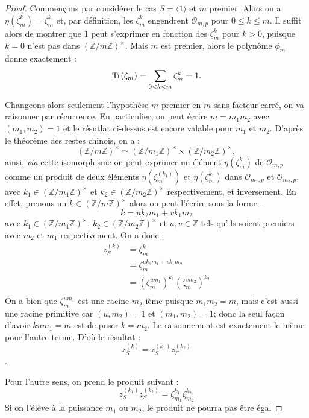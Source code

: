 \documentclass[a4paper]{article} %
\numberwithin{section}{part}
\numberwithin{equation}{section}
\newcommand\nroot[1]{\textit{#1}-ième}
\newcommand\zmodninv[1]{(\mathbb{Z}/#1\mathbb{Z})^{\times}}
\newcommand\EO{\mathcal{O}}
\begin{document}
\begin{proof}

Commençons par considérer le cas $S = \langle1\rangle$ et $m$ premier. Alors on 
a $\eta(\zeta_m^k) = \zeta_m^k$ et, par définition, les $\zeta_m^k$ engendrent 
$\EO_{m,p}$ pour $0 \leq k\leq m$. Il suffit alors de montrer que $1$ peut 
s'exprimer en fonction des $\zeta_m^k$ pour $k > 0$, puisque $k = 0$ n'est pas 
dans $\zmodninv{m}$. Mais $m$ est premier, alors le polynôme $\phi_m$ 
donne exactement :
\begin{equation}
\textup{Tr}(\zeta_m) = \sum_{0 < k < m}{\zeta_m^k} = 1.
\end{equation}

Changeons alors seulement l'hypothèse $m$ premier en $m$ sans facteur carré, on 
va raisonner par récurrence. En particulier, on peut écrire $m = m_1m_2$ avec 
$(m_1,m_2) = 1$ et le résutlat ci-dessus est encore valable pour $m_1$ et 
$m_2$. D'après le théorème des restes chinois, on a :
\[\zmodninv{m} \simeq \zmodninv{m_1} \times \zmodninv{m_2},\]
ainsi, \textit{via} cette isomorphisme on peut exprimer un élément
$\eta(\zeta_m^k)$ de $\EO_{m,p}$ comme un produit de deux éléments
$\eta(\zeta_m^{(k_1)})$ et $\eta(\zeta_m^{k_1})$ dans $\EO_{m_1,p}$ et 
$\EO_{m_2,p}$, avec $k_1\in\zmodninv{m_1}$ et $k_2\in\zmodninv{m_2}$ 
respectivement, et inversement.
\iffalse
En effet, prenons un $k\in\zmodninv{m}$ alors on peut l'écrire sous la forme :
\[k = uk_2m_1 + vk_1m_2\]
avec $k_1\in\zmodninv{m_1}$, $k_2\in\zmodninv{m_2}$ et $u,v\in\mathbb{Z}$ tels 
qu'ils soient premiers avec $m_2$ et $m_1$ respectivement. On a donc :
\begin{align*}
z_S^{(k)} &= \zeta_m^k\\
&= \zeta_m^{uk_2m_1 + vk_1m_2}\\
&= (\zeta_m^{um_1})^{k_1}(\zeta_m^{vm_2})^{k_2}\\
\end{align*}
On a bien que $\zeta_m^{um_1}$ est une racine \nroot{$m_2$} puisque 
$m_1m_2 = m$, mais c'est aussi une racine primitive car $(u,m_2) = 1$ et 
$(m_1, m_2) = 1$; donc la seul façon d'avoir $kum_1 = m$ est de poser $k = m_2$.
Le raisonnement est exactement le même pour l'autre terme. D'où le résultat :
\[z_S^{(k)} = z_S^{(k_1)}z_S^{(k_2)}\].\par
Pour l'autre sens, on prend le produit suivant :
\[z_S^{(k_1)}z_S^{(k_2)} = \zeta_{m_1}^{k_1}\zeta_{m_2}^{k_2}\]
Si on l'élève à la puissance $m_1$ ou $m_2$, le produit ne pourra pas être égal 

\end{proof}
\end{document}
